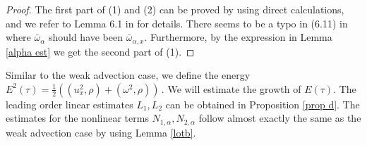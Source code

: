 \documentclass[12pt]{caltech_thesis}
\numberwithin{equation}{section}
\begin{document}
\begin{proof}
The first part of (1) and (2) can be proved by using direct calculations, and we refer to Lemma 6.1 in \cite{chen2021regularity} for details. There seems to be a typo in (6.11) in \cite{chen2021regularity} where $\bar{\omega}_{\alpha}$ should have been $\bar{\omega}_{\alpha,x}$.
    Furthermore, by the expression in Lemma  \ref{alpha est} we get the second part of (1).
\end{proof}
Similar to the weak advection case, we define the energy $E^2(\tau)=\frac{1}{2}((u_x^2,\rho)+(\omega^2,\rho))\,.$ We will estimate the growth of $E(\tau)$.
The leading order linear estimates $L_1, L_2$ can be obtained in Proposition \ref{prop d}.
The estimates for the nonlinear terms $N_{1,\alpha}, N_{2,\alpha}$ follow almost exactly the same as the weak advection case by using Lemma \ref{lotb}. 
\end{document}
